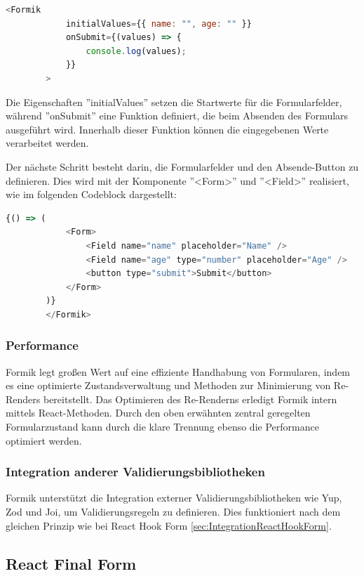         \begin{lstlisting}[language=JavaScript]
        <Formik
            initialValues={{ name: "", age: "" }} 
            onSubmit={(values) => {  
                console.log(values); 
            }}
        >
        \end{lstlisting}
        
        Die Eigenschaften ''initialValues'' setzen die Startwerte für die Formularfelder, während ''onSubmit'' eine Funktion definiert, die beim Absenden des Formulars ausgeführt wird. Innerhalb dieser Funktion können die eingegebenen Werte verarbeitet werden.
        
        Der nächste Schritt besteht darin, die Formularfelder und den Absende-Button zu definieren. Dies wird mit der Komponente ''<Form>'' und ''<Field>'' realisiert, wie im folgenden Codeblock dargestellt:
        
        \begin{lstlisting}[language=JavaScript]
        {() => (
            <Form>  
                <Field name="name" placeholder="Name" />  
                <Field name="age" type="number" placeholder="Age" /> 
                <button type="submit">Submit</button>  
            </Form>
        )}
        </Formik>
        \end{lstlisting}

        \subsubsection{Performance}
        Formik legt großen Wert auf eine effiziente Handhabung von Formularen, indem es eine optimierte Zustandsverwaltung und Methoden zur Minimierung von Re-Renders bereitstellt. Das Optimieren des Re-Renderns erledigt Formik intern mittels React-Methoden. 
        Durch den oben erwähnten zentral geregelten Formularzustand kann durch die klare Trennung ebenso die Performance optimiert werden.
    
        \subsubsection{Integration anderer Validierungsbibliotheken}
        Formik unterstützt die Integration externer Validierungsbibliotheken wie Yup, Zod und Joi, um Validierungsregeln zu definieren. Dies funktioniert nach dem gleichen Prinzip wie bei React Hook Form \ref{sec:IntegrationReactHookForm}. \cite{prompt15_pollak}
    
    \subsection{React Final Form}
